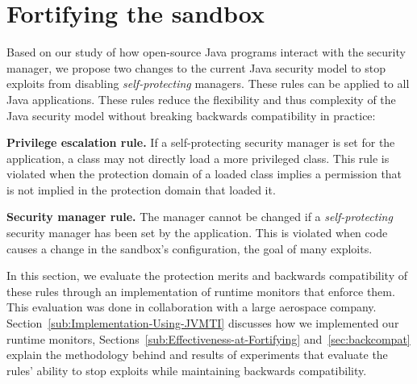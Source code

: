 \documentclass{sig-alternate-05-2015}
\begin{document}
\section{Fortifying the sandbox}\label{sec:Rules-for-Fortifying}

Based on our study of how open-source Java programs interact with the security
manager, we propose two changes to the current Java security model to stop exploits
from disabling \emph{self-protecting} managers.  These rules can be applied
to all Java applications.
These rules reduce the flexibility and thus complexity of the
Java security model without breaking backwards compatibility in practice:

\noindent\textbf{Privilege escalation rule.} If a self-protecting
security manager is set for the application, a class may not directly
load a more privileged class. This rule is violated when the protection
domain of a loaded class implies a permission that is not implied
in the protection domain that loaded it. 

\noindent \textbf{Security manager rule.} The manager cannot
be changed if a \emph{self-protecting} security manager has been set
by the application. This is violated when code causes a change
in the sandbox's configuration, the goal of many exploits.



In this section, we evaluate the protection merits and backwards compatibility
of these rules through an implementation of runtime monitors that
enforce them. This evaluation was done in collaboration with a large aerospace
company.
Section~\ref{sub:Implementation-Using-JVMTI} discusses how we implemented
our runtime monitors, Sections~\ref{sub:Effectiveness-at-Fortifying}
and~\ref{sec:backcompat} explain the methodology behind and results of
experiments that evaluate the rules' ability to stop 
exploits while maintaining backwards compatibility.
\end{document}
